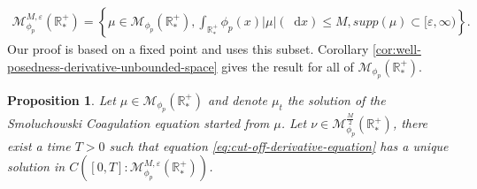 \documentclass[11pt,a4paper]{article}
\newcommand{\RRP}{\mathbb{R}^+_*}
\newcommand{\MC}{\mathcal{M}}
\newcommand{\dd}{\mathop{}\!\mathrm{d}}
\newtheorem{proposition}[theorem]{Proposition}
\begin{document}
\begin{align*}
    \MC^{M,\varepsilon}_{\phi_p}\left(\RRP\right) = \left\lbrace \mu \in \MC_{\phi_p}\left(\RRP\right), \int_{\RRP} \phi_p(x)|\mu|(\dd x) \leq M, supp(\mu) \subset [\varepsilon,\infty) \right\rbrace.
\end{align*}
Our proof is based on a fixed point and uses this subset. Corollary \ref{cor:well-posedness-derivative-unbounded-space} gives the result for all of $\MC_{\phi_p}\left(\RRP\right)$.
\begin{proposition}\label{prop:well-posedness-derivative-cutoff-bounded}
    Let $\mu \in \MC_{\phi_p}\left(\RRP\right) $ and denote $\mu_t$ the solution of the Smoluchowski Coagulation equation started from $\mu$. Let $\nu \in \MC^{\frac{M}{2}}_{\phi_p}\left(\RRP\right)$, there exist a time $T> 0$ such that equation \eqref{eq:cut-off-derivative-equation} has a unique solution in $C\left([0,T]:\MC^{M,\varepsilon}_{\phi_p}\left(\RRP\right) \right)$.
\end{proposition}
\end{document}

